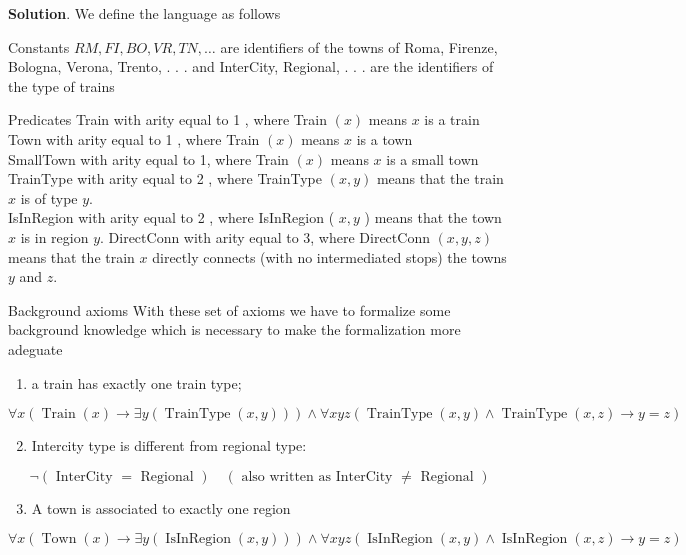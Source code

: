 \begin{sol}{\color{sol}
\textbf{Solution}. We define the language as follows

Constants $RM, FI, BO, VR, TN, \ldots$ are identifiers of the towns of Roma, Firenze, Bologna, Verona, Trento, . . . and InterCity, Regional, . . . are the identifiers of the type of trains

Predicates Train with arity equal to 1 , where Train $(x)$ means $x$ is a train Town with arity equal to 1 , where Train $(x)$ means $x$ is a town\\
SmallTown with arity equal to 1, where Train $(x)$ means $x$ is a small town TrainType with arity equal to 2 , where TrainType $(x, y)$ means that the train $x$ is of type $y$.\\
IsInRegion with arity equal to 2 , where IsInRegion ( $x, y$ ) means that the town $x$ is in region $y$. DirectConn with arity equal to 3, where DirectConn $(x, y, z)$ means that the train $x$ directly connects (with no intermediated stops) the towns $y$ and $z$.

Background axioms With these set of axioms we have to formalize some background knowledge which is necessary to make the formalization more adeguate

\begin{enumerate}
  \item a train has exactly one train type;
\end{enumerate}


\begin{equation*}
\forall x(\operatorname{Train}(x) \rightarrow \exists y(\operatorname{TrainType}(x, y))) \wedge \forall x y z(\operatorname{TrainType}(x, y) \wedge \operatorname{TrainType}(x, z) \rightarrow y=z) \tag{3.1}
\end{equation*}


\begin{enumerate}
  \setcounter{enumi}{1}
  \item Intercity type is different from regional type:
\end{enumerate}


\begin{equation*}
\neg(\text { InterCity }=\text { Regional }) \quad(\text { also written as InterCity } \neq \text { Regional }) \tag{3.2}
\end{equation*}


\begin{enumerate}
  \setcounter{enumi}{2}
  \item A town is associated to exactly one region
\end{enumerate}


\begin{equation*}
\forall x(\operatorname{Town}(x) \rightarrow \exists y(\operatorname{IsInRegion}(x, y))) \wedge \forall x y z(\operatorname{IsInRegion}(x, y) \wedge \operatorname{IsInRegion}(x, z) \rightarrow y=z) \tag{3.3}
\end{equation*}
}\end{sol}
